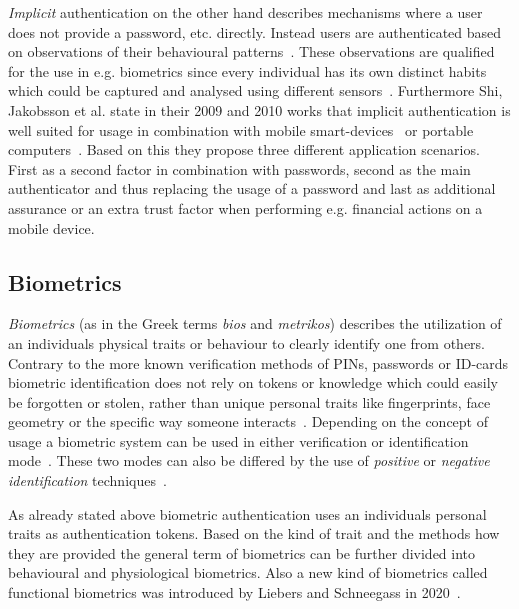 \textit{Implicit} authentication on the other hand describes mechanisms where a user does not provide a password, etc. directly.
Instead users are authenticated based on observations of their behavioural patterns~\cite{jakobsson2009implicit}.
These observations are qualified for the use in e.g. biometrics since every individual has its own distinct habits which could be captured and analysed using different sensors~\cite{shi2010implicit}.
Furthermore Shi, Jakobsson et al. state in their 2009 and 2010 works that implicit authentication is well suited for usage in combination with mobile smart-devices~\cite{shi2010implicit} or portable computers~\cite{jakobsson2009implicit}.
Based on this they propose three different application scenarios.
First as a second factor in combination with passwords, second as the main authenticator and thus replacing the usage of a password and last as additional assurance or an extra trust factor when performing e.g. financial actions on a mobile device.

\subsection{Biometrics}
\textit{Biometrics} (as in the Greek terms \textit{bios} and \textit{metrikos}) describes the utilization of an individuals physical traits or behaviour to clearly identify one from others. Contrary to the more known verification methods of PINs, passwords or ID-cards biometric identification does not rely on tokens or knowledge which could easily be forgotten or stolen, rather than unique personal traits like fingerprints, face geometry or the specific way someone interacts~\cite[chpt. 1.1]{jain2007handbook}\cite{delac2004survey}.
Depending on the concept of usage a biometric system can be used in either verification or identification mode~\cite[chpt. 1.3]{jain2007handbook}.
These two modes can also be differed by the use of \textit{positive} or \textit{negative identification} techniques~\cite{wayman2005introduction}.

As already stated above biometric authentication uses an individuals personal traits as authentication tokens. Based on the kind of trait and the methods how they are provided the general term of biometrics can be further divided into behavioural and physiological biometrics.
Also a new kind of biometrics called functional biometrics was introduced by Liebers and Schneegass in 2020~\cite{schneegass2020functbiometric}.

